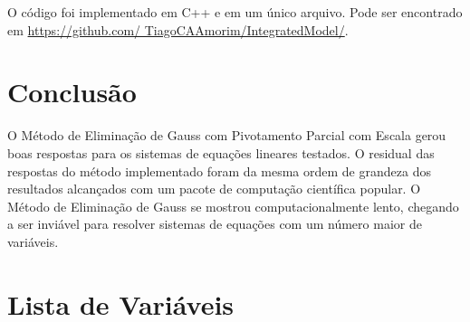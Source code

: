 \documentclass[final,5p]{elsarticle}
\numberwithin{equation}{section}
\begin{document}
        O código foi implementado em C++ e em um único arquivo. Pode ser encontrado em \href{https://github.com/TiagoCAAmorim/IntegratedModel/}{https://github.com/ TiagoCAAmorim/IntegratedModel/}.

    \section{Conclusão}

        O Método de Eliminação de Gauss com Pivotamento Parcial com Escala gerou boas respostas para os sistemas de equações lineares testados. O residual das respostas do método implementado foram da mesma ordem de grandeza dos resultados alcançados com um pacote de computação científica popular. O Método de Eliminação de Gauss se mostrou computacionalmente lento, chegando a ser inviável para resolver sistemas de equações com um número maior de variáveis.



\appendix

\section{Lista de Variáveis}
\end{document}

